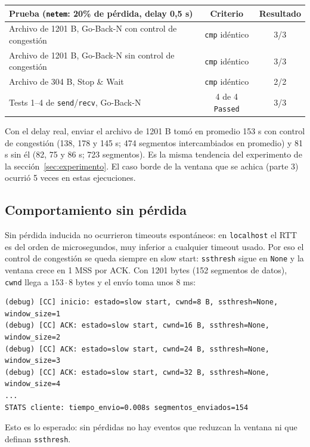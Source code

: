 \documentclass[11pt,letterpaper]{article}
\begin{document}
\begin{center}
\begin{tabular}{@{}lcc@{}}
  \toprule
  Prueba (\texttt{netem}: 20\% de pérdida, delay 0,5 s) & Criterio & Resultado \\
  \midrule
  Archivo de 1201 B, Go-Back-N con control de congestión & \texttt{cmp} idéntico & 3/3 \\
  Archivo de 1201 B, Go-Back-N sin control de congestión & \texttt{cmp} idéntico & 3/3 \\
  Archivo de 304 B, Stop \& Wait & \texttt{cmp} idéntico & 2/2 \\
  Tests 1--4 de \texttt{send}/\texttt{recv}, Go-Back-N & 4 de 4 \texttt{Passed} & 3/3 \\
  \bottomrule
\end{tabular}
\end{center}

Con el delay real, enviar el archivo de 1201 B tomó en promedio 153 s con control de
congestión (138, 178 y 145 s; 474 segmentos intercambiados en promedio) y 81 s sin él
(82, 75 y 86 s; 723 segmentos). Es la misma tendencia del experimento de la
sección~\ref{sec:experimento}. El caso borde de la ventana que se achica (parte 3)
ocurrió 5 veces en estas ejecuciones.

\subsection{Comportamiento sin pérdida}

Sin pérdida inducida no ocurrieron timeouts espontáneos: en \texttt{localhost} el RTT es
del orden de microsegundos, muy inferior a cualquier timeout usado. Por eso el control de
congestión se queda siempre en slow start: \texttt{ssthresh} sigue en \texttt{None} y la
ventana crece en 1 MSS por ACK. Con 1201 bytes (152 segmentos de datos), \texttt{cwnd}
llega a $153 \cdot 8$ bytes y el envío toma unos 8 ms:

\begin{lstlisting}
(debug) [CC] inicio: estado=slow start, cwnd=8 B, ssthresh=None, window_size=1
(debug) [CC] ACK: estado=slow start, cwnd=16 B, ssthresh=None, window_size=2
(debug) [CC] ACK: estado=slow start, cwnd=24 B, ssthresh=None, window_size=3
(debug) [CC] ACK: estado=slow start, cwnd=32 B, ssthresh=None, window_size=4
...
STATS cliente: tiempo_envio=0.008s segmentos_enviados=154
\end{lstlisting}

Esto es lo esperado: sin pérdidas no hay eventos que reduzcan la ventana ni que definan
\texttt{ssthresh}.
\end{document}
